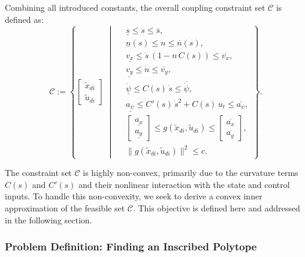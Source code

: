 Combining all introduced constants, the overall coupling constraint set \(\mathcal{C}\) is defined as:
\begin{equation}
	\mathcal{C} := \left\{
	\begin{bmatrix} \tilde{x}_{di} \\ \tilde{u}_{di} \end{bmatrix} \; \middle|\;
	\begin{aligned}
		 & \underline{s} \leq s \leq \overline{s},                                                        \\
		 & \underline{n}(s) \leq n \leq \overline{n}(s),                                                  \\
		 & \underline{v_x} \leq \dot{s}\,(1 - n\,C(s)) \leq \overline{v_x},                               \\
		 & \underline{v_y} \leq \dot{n} \leq \overline{v_y},                                              \\
		 & \underline{\dot{\psi}} \leq C(s)\,\dot{s} \leq \overline{\dot{\psi}},                          \\
		 & \underline{a_{\psi}} \leq C'(s)\,\dot{s}^2 + C(s)\,u_t \leq \overline{a_{\psi}},               \\
		 & \begin{bmatrix}
			   \underline{a_x} \\[2mm] \underline{a_y}
		   \end{bmatrix} \leq g(\tilde{x}_{di}, \tilde{u}_{di}) \leq \begin{bmatrix}
			                                                             \overline{a_x} \\[2mm] \overline{a_y}
		                                                             \end{bmatrix}, \\
		 & \|g(\tilde{x}_{di}, \tilde{u}_{di})\|^2 \leq c.
	\end{aligned}
	\right\}.
\end{equation}

The constraint set \(\mathcal{C}\) is highly non-convex, primarily due to the curvature terms \(C(s)\) and \(C'(s)\) and their nonlinear interaction
with the state and control inputs.
To handle this non-convexity, we seek to derive a convex inner approximation of the feasible set \(\mathcal{C}\).
This objective is defined here and addressed in the following section.

\subsubsection{Problem Definition: Finding an Inscribed Polytope}
\label{problem:inscribed_polytope}


